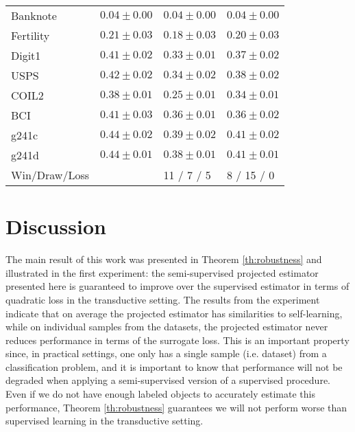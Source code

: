 \documentclass{article}
\renewcommand{\vec}[1]{\mathbf{#1}}
\begin{document}
\begin{table*}[t]
\begin{tabular}{|l|lll|}
Banknote & $0.04 \pm 0.00$& $0.04 \pm 0.00$& $0.04 \pm 0.00$\\ 
Fertility & $0.21 \pm 0.03$& $\mathbf{0.18 \pm 0.03} $& $0.20 \pm 0.03$\\ 
Digit1 & $0.41 \pm 0.02$& $\mathbf{0.33 \pm 0.01} $& $\mathbf{0.37 \pm 0.02} $\\ 
USPS & $0.42 \pm 0.02$& $\mathbf{0.34 \pm 0.02} $& $\mathbf{0.38 \pm 0.02} $\\ 
COIL2 & $0.38 \pm 0.01$& $\mathbf{0.25 \pm 0.01} $& $\mathbf{0.34 \pm 0.01} $\\ 
BCI & $0.41 \pm 0.03$& $\mathbf{0.36 \pm 0.01} $& $\mathbf{0.36 \pm 0.02} $\\ 
g241c & $0.44 \pm 0.02$& $\mathbf{0.39 \pm 0.02} $& $\mathbf{0.41 \pm 0.02} $\\ 
g241d & $0.44 \pm 0.01$& $\mathbf{0.38 \pm 0.01} $& $\mathbf{0.41 \pm 0.01} $\\
\hline
\hline
Win/Draw/Loss & & 11 / 7 / 5 & 8 / 15 / 0 \\ 
\hline
\end{tabular}


\end{table*}

\section{Discussion}
The main result of this work was presented in Theorem \ref{th:robustness} and illustrated in the first experiment: the semi-supervised projected estimator presented here is guaranteed to improve over the supervised estimator in terms of quadratic loss in the transductive setting. The results from the experiment indicate that on average the projected estimator has similarities to self-learning, while on individual samples from the datasets, the projected estimator never reduces performance in terms of the surrogate loss. This is an important property since, in practical settings, one only has a single sample (i.e. dataset) from a classification problem, and it is important to know that performance will not be degraded when applying a semi-supervised version of a supervised procedure. Even if we do not have enough labeled objects to accurately estimate this performance, Theorem \ref{th:robustness} guarantees we will not perform worse than supervised learning in the transductive setting. 

\end{document}
